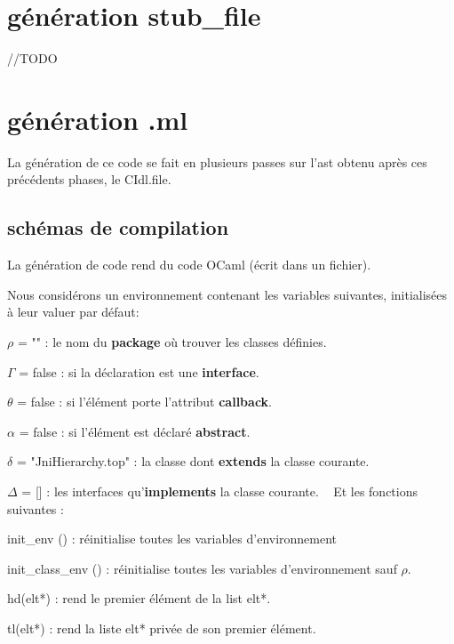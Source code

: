 \documentclass[a4paper, 11pt]{report}
\begin{document}
\section{génération stub\_file}
//TODO











\section{génération .ml}

La génération de ce code se fait en plusieurs passes sur l'ast obtenu
après ces précédents phases, le CIdl.file.

\subsection{schémas de compilation}
La génération de code rend du code OCaml (écrit dans un fichier).

\noindent
Nous considérons un environnement contenant les  variables suivantes, initialisées à leur valuer par défaut: 

$\rho$ = "" : le nom du \textbf{package} où trouver les classes définies.

$\Gamma$ = false : si la déclaration est une \textbf{interface}.

$\theta$ = false : si l'élément porte l'attribut \textbf{callback}.

$\alpha$ = false : si l'élément est déclaré \textbf{abstract}.

$\delta$ = "JniHierarchy.top" : la classe dont \textbf{extends} la classe courante.

$\Delta$ = [] : les interfaces qu'\textbf{implements} la classe courante.
\
\newline
\noindent
Et les fonctions suivantes :

init\_env () : réinitialise toutes les variables d'environnement 

init\_class\_env () : réinitialise toutes les variables d'environnement sauf $\rho$.

hd(elt*) : rend le premier élément de la list elt*.

tl(elt*) : rend la liste elt* privée de son premier élément.
\end{document}
